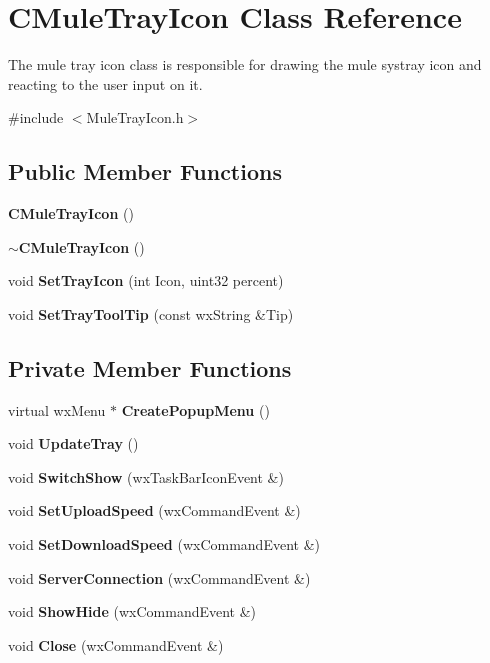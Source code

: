 \section{CMuleTrayIcon Class Reference}
\label{classCMuleTrayIcon}


The mule tray icon class is responsible for drawing the mule systray icon and reacting to the user input on it.  


{\ttfamily \#include $<$MuleTrayIcon.h$>$}\subsection*{Public Member Functions}
\begin{DoxyCompactItemize}
\item 
{\bf CMuleTrayIcon} ()\label{classCMuleTrayIcon_a2a13121da9a46f8c417709935b8c816b}

\item 
{\bf $\sim$CMuleTrayIcon} ()\label{classCMuleTrayIcon_a14d525ac709168486edae9a97658bac3}

\item 
void {\bf SetTrayIcon} (int Icon, uint32 percent)
\item 
void {\bf SetTrayToolTip} (const wxString \&Tip)
\end{DoxyCompactItemize}
\subsection*{Private Member Functions}
\begin{DoxyCompactItemize}
\item 
virtual wxMenu $\ast$ {\bfseries CreatePopupMenu} ()\label{classCMuleTrayIcon_a3215c1a611d29cbb38f6e6dda331c202}

\item 
void {\bfseries UpdateTray} ()\label{classCMuleTrayIcon_a20d7f57a075883d6cdb197ef822fee84}

\item 
void {\bfseries SwitchShow} (wxTaskBarIconEvent \&)\label{classCMuleTrayIcon_aea614edca4c7f4c44f2032a1522fe6ce}

\item 
void {\bfseries SetUploadSpeed} (wxCommandEvent \&)\label{classCMuleTrayIcon_a7e22443f6ec07701f80bbfe7788a0aac}

\item 
void {\bfseries SetDownloadSpeed} (wxCommandEvent \&)\label{classCMuleTrayIcon_a4aa0ac64546213caffb5818dd7fee1cf}

\item 
void {\bfseries ServerConnection} (wxCommandEvent \&)\label{classCMuleTrayIcon_a6e0143b69cb4a29db0386e7e9d2cb987}

\item 
void {\bfseries ShowHide} (wxCommandEvent \&)\label{classCMuleTrayIcon_a89a64530ce6ff5abf16c7407f1a1a3de}

\item 
void {\bfseries Close} (wxCommandEvent \&)\label{classCMuleTrayIcon_ab48f72c5eba4cca4d06a01b8f4afbfc0}

\end{DoxyCompactItemize}
